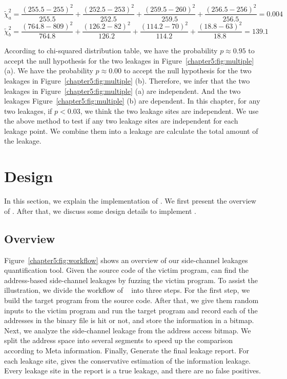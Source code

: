 \[\tilde{\chi}^2_{a}= \frac{(255.5-255)^2}{255.5} + \frac{(252.5-253)^2}{252.5} + \frac{(259.5-260)^2}{259.5} + \frac{(256.5-256)^2}{256.5} = 0.004\] 
\[\tilde{\chi}^2_{b}= \frac{(764.8-809)^2}{764.8} + \frac{(126.2-82)^2}{126.2} + \frac{(114.2-70)^2}{114.2} + \frac{(18.8-63)^2}{18.8} = 139.1\] 

According to chi-squared distribution table, we have the probability $p\approx0.95$ to accept the null hypothesis for the two leakages in Figure~\ref{chapter5:fig:multiple} (a). We have the probability $p\approx0.00$ to accept the null hypothesis for the two leakages in Figure~\ref{chapter5:fig:multiple} (b). Therefore, we infer that the two leakages in Figure~\ref{chapter5:fig:multiple} (a) are independent. And the two leakages Figure~\ref{chapter5:fig:multiple} (b) are dependent. In this chapter, for any two leakages, if $p < 0.03$, we think the two leakage sites are independent. We use the above method to test if any two leakage sites are independent for each leakage point. We combine them into a leakage are calculate the total amount of the leakage.
\section{Design}
In this section, we explain the implementation of \ctool{}.
We first present the overview of \ctool{}. After that, we discuss some design details to implement \ctool{}.

\subsection{Overview}
Figure~\ref{chapter5:fig:workflow} shows an overview of our side-channel leakages quantification tool. Given the source code of the victim program, \ctool{} can find the address-based side-channel leakages by fuzzing the victim program. To assist the illustration, we divide the workflow of ~\ctool{} into three steps. For the first step, we build the target program from the source code. After that, we give them random inputs to the victim program and run the target program and record each of the addresses in the binary file is hit or not, and store the information in a bitmap. Next, we analyze the side-channel leakage from the address access bitmap. We split the address space into several segments to speed up the comparison according to Meta information. Finally, \ctool{} Generate the final leakage report. For each leakage site, \ctool{} gives the conservative estimation of the information leakage. Every leakage site in the report is a true leakage, and there are no false positives.


